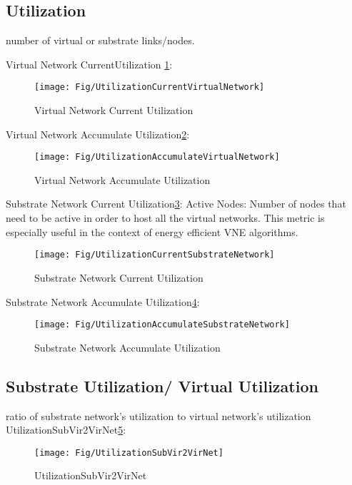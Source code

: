 \subsection{Utilization}
number of virtual or substrate links/nodes.

Virtual Network CurrentUtilization \ref{fig:UtilizationCurrentVirtualNetwork}:
\begin{figure}
  \centering
  \texttt{[image: Fig/UtilizationCurrentVirtualNetwork]}\\
  \caption{Virtual Network Current Utilization}\label{fig:UtilizationCurrentVirtualNetwork}
\end{figure}

Virtual Network Accumulate Utilization\ref{fig:UtilizationAccumulateVirtualNetwork}:
\begin{figure}
  \centering
  \texttt{[image: Fig/UtilizationAccumulateVirtualNetwork]}\\
  \caption{Virtual Network Accumulate Utilization}\label{fig:UtilizationAccumulateVirtualNetwork}
\end{figure}

Substrate Network Current Utilization\ref{fig:UtilizationCurrentSubstrateNetwork}: Active Nodes: Number of nodes that need to be active in order to host all the virtual networks. This metric is especially useful in the context of energy efficient VNE algorithms.
\begin{figure}
  \centering
  \texttt{[image: Fig/UtilizationCurrentSubstrateNetwork]}\\
  \caption{Substrate Network Current Utilization}\label{fig:UtilizationCurrentSubstrateNetwork}
\end{figure}

Substrate Network Accumulate Utilization\ref{fig:UtilizationAccumulateSubstrateNetwork}:
\begin{figure}
  \centering
  \texttt{[image: Fig/UtilizationAccumulateSubstrateNetwork]}\\
  \caption{Substrate Network Accumulate Utilization}\label{fig:UtilizationAccumulateSubstrateNetwork}
\end{figure}


\subsection{Substrate Utilization/ Virtual Utilization}
ratio of substrate network's utilization to virtual network's utilization
UtilizationSubVir2VirNet\ref{fig:UtilizationSubVir2VirNet}:
\begin{figure}
  \centering
  \texttt{[image: Fig/UtilizationSubVir2VirNet]}\\
  \caption{UtilizationSubVir2VirNet}\label{fig:UtilizationSubVir2VirNet}
\end{figure}

